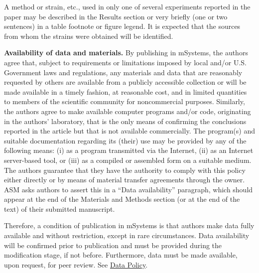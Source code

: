 \documentclass[lineno]{asm-article}
\begin{document}
A method or strain, etc., used in only one of several experiments reported in the paper may be described in the Results section or very briefly (one or two sentences) in a table footnote or figure legend. It is expected that the sources from whom the strains were obtained will be identified.

\textbf{Availability of data and materials.} By publishing in mSystems, the authors agree that, subject to requirements or limitations imposed by local and/or U.S. Government laws and regulations, any materials and data that are reasonably requested by others are available from a publicly accessible collection or will be made available in a timely fashion, at reasonable cost, and in limited quantities to members of the scientific community for noncommercial purposes. Similarly, the authors agree to make available computer programs and/or code, originating in the authors’ laboratory, that is the only means of confirming the conclusions reported in the article but that is not available commercially. The program(s) and suitable documentation regarding its (their) use may be provided by any of the following means: (i) as a program transmitted via the Internet, (ii) as an Internet server-based tool, or (iii) as a compiled or assembled form on a suitable medium. The authors guarantee that they have the authority to comply with this policy either directly or by means of material transfer agreements through the owner. ASM asks authors to assert this in a “Data availability” paragraph, which should appear at the end of the Materials and Methods section (or at the end of the text) of their submitted manuscript.

Therefore, a condition of publication in mSystems is that authors make data fully available and without restriction, except in rare circumstances. Data availability will be confirmed prior to publication and must be provided during the modification stage, if not before. Furthermore, data must be made available, upon request, for peer review. See \href{https://journals.asm.org/open-data-policy}{Data Policy}.
\end{document}
